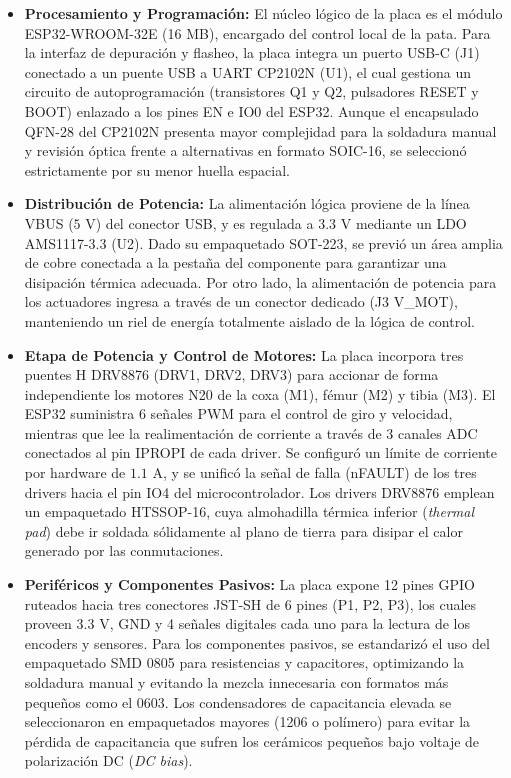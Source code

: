 \begin{itemize}
    \item \textbf{Procesamiento y Programación:} El núcleo lógico de la placa es el módulo ESP32-WROOM-32E (16 MB), encargado del control local de la pata. Para la interfaz de depuración y flasheo, la placa integra un puerto USB-C (J1) conectado a un puente USB a UART CP2102N (U1), el cual gestiona un circuito de autoprogramación (transistores Q1 y Q2, pulsadores RESET y BOOT) enlazado a los pines EN e IO0 del ESP32. Aunque el encapsulado QFN-28 del CP2102N presenta mayor complejidad para la soldadura manual y revisión óptica frente a alternativas en formato SOIC-16, se seleccionó estrictamente por su menor huella espacial.
    \item \textbf{Distribución de Potencia:} La alimentación lógica proviene de la línea VBUS ($5\text{ V}$) del conector USB, y es regulada a $3.3\text{ V}$ mediante un LDO AMS1117-3.3 (U2). Dado su empaquetado SOT-223, se previó un área amplia de cobre conectada a la pestaña del componente para garantizar una disipación térmica adecuada. Por otro lado, la alimentación de potencia para los actuadores ingresa a través de un conector dedicado (J3 V\_MOT), manteniendo un riel de energía totalmente aislado de la lógica de control.
    \item \textbf{Etapa de Potencia y Control de Motores:} La placa incorpora tres puentes H DRV8876 (DRV1, DRV2, DRV3) para accionar de forma independiente los motores N20 de la coxa (M1), fémur (M2) y tibia (M3). El ESP32 suministra 6 señales PWM para el control de giro y velocidad, mientras que lee la realimentación de corriente a través de 3 canales ADC conectados al pin IPROPI de cada driver. Se configuró un límite de corriente por hardware de $1.1\text{ A}$, y se unificó la señal de falla (nFAULT) de los tres drivers hacia el pin IO4 del microcontrolador. Los drivers DRV8876 emplean un empaquetado HTSSOP-16, cuya almohadilla térmica inferior (\textit{thermal pad}) debe ir soldada sólidamente al plano de tierra para disipar el calor generado por las conmutaciones.
    \item \textbf{Periféricos y Componentes Pasivos:} La placa expone 12 pines GPIO ruteados hacia tres conectores JST-SH de 6 pines (P1, P2, P3), los cuales proveen $3.3\text{ V}$, GND y 4 señales digitales cada uno para la lectura de los encoders y sensores. Para los componentes pasivos, se estandarizó el uso del empaquetado SMD 0805 para resistencias y capacitores, optimizando la soldadura manual y evitando la mezcla innecesaria con formatos más pequeños como el 0603. Los condensadores de capacitancia elevada se seleccionaron en empaquetados mayores (1206 o polímero) para evitar la pérdida de capacitancia que sufren los cerámicos pequeños bajo voltaje de polarización DC (\textit{DC bias}).
\end{itemize}

